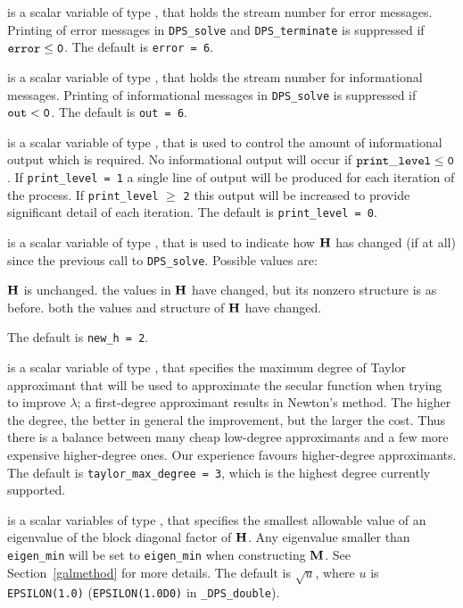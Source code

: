 \documentclass{galahad}
\newcommand{\packagename}{DPS}
\newcommand{\fullpackagename}{\libraryname\_\packagename}
\begin{document}
\begin{description}
 is a scalar variable of type \integer, that holds the
stream number for error messages.
Printing of error messages in
{\tt \packagename\_solve} and {\tt \packagename\_terminate}
is suppressed if ${\tt error} \leq {\tt 0}$.
The default is {\tt error = 6}.

 is a scalar variable of type \integer, that holds the
stream number for informational messages.
Printing of informational messages in
{\tt \packagename\_solve} is suppressed if ${\tt out} < {\tt 0}$.
The default is {\tt out = 6}.

 is a scalar variable of type \integer,
that is used
to control the amount of informational output which is required. No
informational output will occur if ${\tt print\_level} \leq {\tt 0}$. If
{\tt print\_level = 1} a single line of output will be produced for each
iteration of the process. If {\tt print\_level} $\geq$ {\tt 2} this output
will be increased to provide significant detail of each iteration.
The default is {\tt print\_level = 0}.

 is a scalar variable of type \integer, that is used
to indicate how ${\mathbf{H}}$ has changed (if at all) since the previous call
to {\tt \packagename\_solve}. Possible values are:
\begin{description}
 ${\mathbf{H}}$ is unchanged.
 the values in ${\mathbf{H}}$ have changed, but its nonzero structure
is as before.
 both the values and structure of ${\mathbf{H}}$ have changed.
\end{description}
The default is {\tt new\_h = 2}.

 is a scalar variable of type \integer,
that specifies the maximum degree of Taylor approximant that will be used
to approximate the secular function when trying to improve $\lambda$;
a first-degree approximant results in Newton's method.
The higher the degree, the better in general the improvement, but the larger the
cost. Thus there is a balance between many cheap low-degree approximants
and a few more expensive higher-degree ones. Our experience favours
higher-degree approximants.
The default is {\tt taylor\_max\_degree = 3}, which is the highest degree
currently supported.

 is a scalar variables of type \realdp, that specifies the
smallest allowable value of an eigenvalue of the block diagonal factor of
${\mathbf{H}}$. Any eigenvalue smaller than {\tt eigen\_min}
will be set to {\tt eigen\_min} when constructing ${\mathbf{M}}$.
See Section~\ref{galmethod} for more details.
The default is $\sqrt{u}$, where $u$ is
{\tt EPSILON(1.0)} ({\tt EPSILON(1.0D0)} in {\tt \fullpackagename\_double}).


\end{description}
\end{document}
